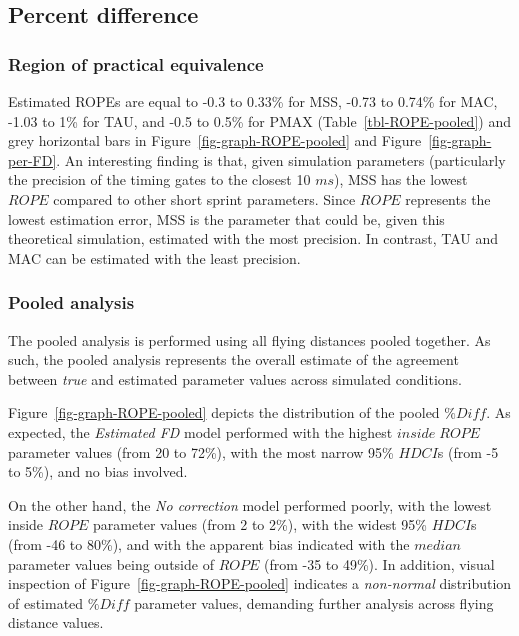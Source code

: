 \documentclass[
  letterpaper,
  DIV=11,
  numbers=noendperiod]{scrartcl}
\begin{document}
\hypertarget{percent-difference}{%
\subsection{Percent difference}\label{percent-difference}}

\hypertarget{region-of-practical-equivalence}{%
\subsubsection{Region of practical
equivalence}\label{region-of-practical-equivalence}}

Estimated ROPEs are equal to -0.3 to 0.33\% for MSS, -0.73 to 0.74\% for
MAC, -1.03 to 1\% for TAU, and -0.5 to 0.5\% for PMAX
(Table~\ref{tbl-ROPE-pooled}) and grey horizontal bars in
Figure~\ref{fig-graph-ROPE-pooled} and Figure~\ref{fig-graph-per-FD}. An
interesting finding is that, given simulation parameters (particularly
the precision of the timing gates to the closest 10 \(ms\)), MSS has the
lowest \(ROPE\) compared to other short sprint parameters. Since
\(ROPE\) represents the lowest estimation error, MSS is the parameter
that could be, given this theoretical simulation, estimated with the
most precision. In contrast, TAU and MAC can be estimated with the least
precision.

\hypertarget{pooled-analysis}{%
\subsubsection{Pooled analysis}\label{pooled-analysis}}

The pooled analysis is performed using all flying distances pooled
together. As such, the pooled analysis represents the overall estimate
of the agreement between \emph{true} and estimated parameter values
across simulated conditions.

Figure~\ref{fig-graph-ROPE-pooled} depicts the distribution of the
pooled \(\%Diff\). As expected, the \emph{Estimated FD} model performed
with the highest \(inside \; ROPE\) parameter values (from 20 to 72\%),
with the most narrow 95\% \(HDCI\)s (from -5 to 5\%), and no bias
involved.

On the other hand, the \emph{No correction} model performed poorly, with
the lowest inside \(ROPE\) parameter values (from 2 to 2\%), with the
widest 95\% \(HDCI\)s (from -46 to 80\%), and with the apparent bias
indicated with the \(median\) parameter values being outside of \(ROPE\)
(from -35 to 49\%). In addition, visual inspection of
Figure~\ref{fig-graph-ROPE-pooled} indicates a \emph{non-normal}
distribution of estimated \(\%Diff\) parameter values, demanding further
analysis across flying distance values.
\end{document}
